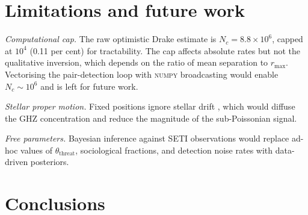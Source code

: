 \documentclass[useAMS,usenatbib]{mn2e}
\begin{document}
\section{Limitations and future work}
\label{sec:limitations}

\textit{Computational cap.}
The raw optimistic Drake estimate is $N_c = 8.8\times10^6$,
capped at $10^4$ (0.11 per cent) for tractability.
The cap affects absolute rates but not the qualitative inversion,
which depends on the ratio of mean separation to $r_\text{max}$.
Vectorising the pair-detection loop with \textsc{numpy} broadcasting
would enable $N_c \sim 10^6$ and is left for future work.

\textit{Stellar proper motion.}
Fixed positions ignore stellar drift \citep[$\sim 30$\,km\,s$^{-1}$;][]{carrollnellenback2019},
which would diffuse the GHZ concentration and reduce the magnitude
of the sub-Poissonian signal.

\textit{Free parameters.}
Bayesian inference against SETI observations would replace ad-hoc
values of $\theta_\text{threat}$, sociological fractions, and
detection noise rates with data-driven posteriors.

\section{Conclusions}
\label{sec:conclusions}
\end{document}
